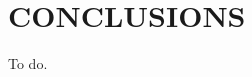 \documentclass[letterpaper, 10 pt, conference]{ieeeconf}  %
\begin{document}






\section{\label{sec:conclusions} CONCLUSIONS}

To do.

\addtolength{\textheight}{-12cm}   %






%





\end{document}

